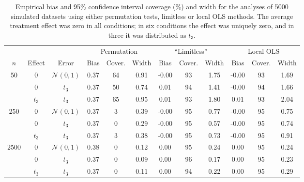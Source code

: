 
\begin{table}
\footnotesize
\begin{tabular}{ccc|ccc|ccc|ccc}
\hline

&&& \multicolumn{ 3 }{c}{Permutation}&\multicolumn{ 3 }{c}{``Limitless''}&\multicolumn{ 3 }{c}{Local OLS}\\
$n$& Effect& Error & Bias&Cover.&Width&Bias&Cover.&Width&Bias&Cover.&Width \\
\hline 
\hline 
\multirow{3}{*}{ 50 } &0& $\mathcal{N}(0,1)$ &0.37&64&0.91&-0.00&93&1.75&-0.00&93&1.69 \\ 
 &  0 & $t_3$ &0.37&50&0.74&0.01&94&1.41&-0.00&94&1.66 \\ 
 &  $t_3$ & $t_3$ &0.37&65&0.95&0.01&93&1.80&0.01&93&2.04 \\ 
\hline 
\multirow{3}{*}{ 250 } &0& $\mathcal{N}(0,1)$ &0.37&3&0.39&-0.00&95&0.77&-0.00&95&0.75 \\ 
 &  0 & $t_3$ &0.37&0&0.29&-0.00&95&0.57&-0.00&95&0.74 \\ 
 &  $t_3$ & $t_3$ &0.37&3&0.38&-0.00&95&0.73&-0.00&95&0.91 \\ 
\hline 
\multirow{3}{*}{ 2500 } &0& $\mathcal{N}(0,1)$ &0.38&0&0.12&0.00&95&0.24&0.00&95&0.24 \\ 
 &  0 & $t_3$ &0.37&0&0.09&0.00&96&0.17&0.00&95&0.23 \\ 
 &  $t_3$ & $t_3$ &0.37&0&0.11&0.00&94&0.22&0.00&95&0.29 \\ 
\hline
\end{tabular}
  \caption{Empirical bias and 95\% confidence interval coverage (\%) and width for the analyses of  5000 simulated datasets using either permutation tests, limitless or local OLS methods. The average treatment effect was zero in all conditions; in six conditions the effect was uniquely zero, and in three it was distributed as $t_3$.}
  \label{tab:level}
\end{table}
